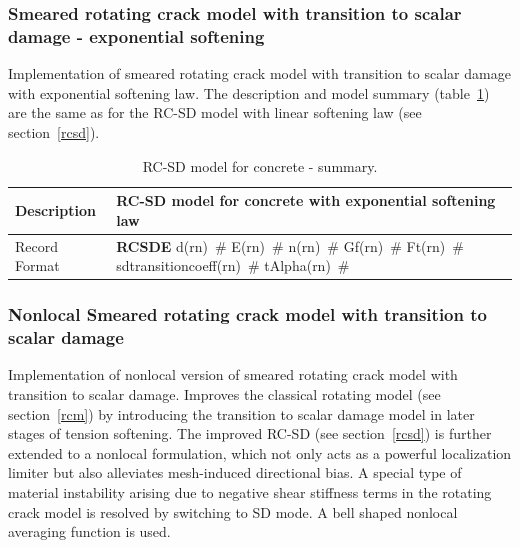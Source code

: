 \documentclass[epsf,a4paper]{article}
\newcommand{\descitem}[1]{{\noindent \bf #1}}
\newcommand{\elemparam}[2]{{{#1\tiny (#2)}~\#}}
\begin{document}
\subsubsection{Smeared rotating crack model with transition to scalar
damage - exponential softening}
\label{rcsde}
Implementation of smeared rotating crack model with transition to
scalar damage with exponential softening law. 
The description and model summary (table~\ref{rcsde_table}) are the
same as for the RC-SD model with linear softening law (see section~\ref{rcsd}).
\begin{table}[h]                                                                
\begin{tabular}{|l|p{9cm}|}                                                      
\hline                                                                          
Description & RC-SD model for concrete with exponential softening law\\
\hline                                                                          
Record Format & \descitem{RCSDE} \elemparam{d}{rn} \elemparam{E}{rn}
\elemparam{n}{rn} \elemparam{Gf}{rn} \elemparam{Ft}{rn} \elemparam{sdtransitioncoeff}{rn} \elemparam{tAlpha}{rn} \\
\hline
\end{tabular}                                                                   
\caption{RC-SD model for  concrete - summary.}                
\label{rcsde_table}                                                         
\end{table}                                                                     

\subsubsection{Nonlocal Smeared rotating crack model with transition to scalar damage}
\label{rcsdnl}
Implementation of nonlocal version of smeared rotating crack model with transition to
scalar damage. 
Improves the classical rotating model (see
section~\ref{rcm}) by introducing the transition to scalar damage
model in  later stages of tension softening. 
The improved RC-SD (see section~\ref{rcsd}) is further extended to a
nonlocal formulation, which not only acts as a powerful localization
limiter but also alleviates mesh-induced directional bias. A special
type of material instability arising due to negative shear stiffness
terms in the rotating crack model is resolved by switching to SD mode. A bell shaped nonlocal
averaging function is used.
\end{document}
